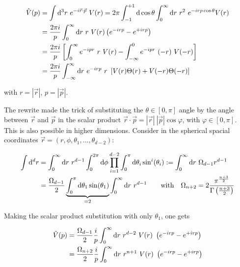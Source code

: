 \documentclass[10pt,a4paper, fleqn]{article}
\begin{document}
\begin{align}
\hat V(p) &= \int \mathrm{d}^3 r ~e^{-i \vec r \cdot \vec p}~ V(r) = 2\pi \int_{-1}^{+1} \mathrm{d} \cos \theta \int_0^\infty \mathrm{d} r ~r^2 ~e^{-i r p \cos \theta} V(r) \\
&= \frac{2 \pi i}{p} \int_0^\infty \mathrm{d} r ~r ~V(r) \left( e^{-irp} - e^{+irp} \right) \\
&= \frac{2 \pi i}{p} \left[
\int_0^\infty e^{-ipr}~r~V(r)
- \int_{-\infty}^0 e^{-ipr}~(-r)~V(-r)
\right] \\
&= \frac{2\pi i}{p} \int_{-\infty}^\infty \mathrm{d} r ~e^{-irp} ~r ~\left[ V(r) \Theta(r) + V(-r) \Theta(-r) \right] \label{eq:FourNinf}
\end{align}

with $r=|\vec r|$, $p=|\vec p|$.

%
%
%

The rewrite made the trick of substituting the $\theta \in [0,\pi]$ angle by the angle between $\vec r$ and $\vec p$ in the scalar product $\vec r \cdot \vec p = |\vec r|~|\vec p| \cos \varphi$, with $\varphi \in [0,\pi]$. This is also possible in higher dimensions. Consider in the spherical spacial coordinates $\vec r = (r,\phi,\theta_1,\dots,\theta_{d-2})$:

\begin{align}
\int \mathrm{d}^d r &= \int_0^\infty \mathrm{d} r ~r^{d-1}
\int_0^{2\pi} \mathrm{d} \phi
\prod_{i=1}^{d-2} \int_0^\pi \mathrm{d} \theta_i \sin^i (\theta_i)
:= \int_0^\infty \mathrm{d} r ~\Omega_{d-1} r^{d-1} \\
&= \frac {\Omega_{d-1}}2 \underbrace{\int_0^\pi \mathrm{d} \theta_1 \sin(\theta_1)}_{=2} \int_0^\infty \mathrm{d} r ~r^{d-1}
\quad\quad
\text{with}
\quad
\Omega_{n+2} = 2 \frac{\pi^\frac{n+3}{2}}{\Gamma\left(\frac{n+3}{2}\right)}
\end{align}

Making the scalar product substitution with only $\theta_1$, one gets

\begin{align}
\tilde V(p) &= \frac {\Omega_{d-1}}{2}
\frac ip  \int_0^\infty
\mathrm{d} r~r^{d-2}~V(r)~\left(e^{-irp} - e^{+irp}\right) \\
&= \frac {\Omega_{n+2}}{2}
\frac ip  \int_0^\infty
\mathrm{d} r~r^{n+1}~V(r)~\left(e^{-irp} - e^{+irp}\right) \label{eq:FinalVpNdim}
\end{align}
\end{document}
